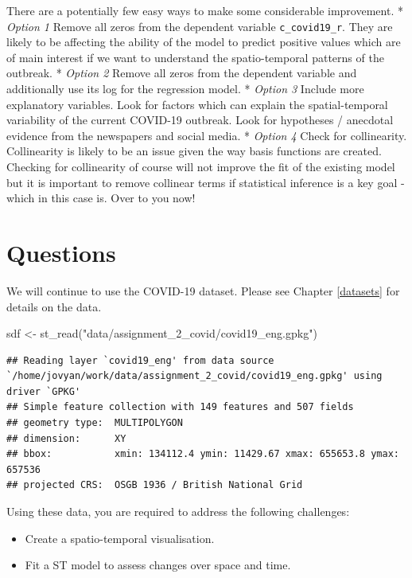 \documentclass[
]{book}
\newenvironment{Shaded}{\begin{snugshade}}{\end{snugshade}}
\newcommand{\FunctionTok}[1]{\textcolor[rgb]{0.00,0.00,0.00}{#1}}
\newcommand{\NormalTok}[1]{#1}
\newcommand{\OtherTok}[1]{\textcolor[rgb]{0.56,0.35,0.01}{#1}}
\newcommand{\StringTok}[1]{\textcolor[rgb]{0.31,0.60,0.02}{#1}}
\begin{document}
There are a potentially few easy ways to make some considerable improvement.
* \emph{Option 1} Remove all zeros from the dependent variable \texttt{c\_covid19\_r}. They are likely to be affecting the ability of the model to predict positive values which are of main interest if we want to understand the spatio-temporal patterns of the outbreak.
* \emph{Option 2} Remove all zeros from the dependent variable and additionally use its log for the regression model.
* \emph{Option 3} Include more explanatory variables. Look for factors which can explain the spatial-temporal variability of the current COVID-19 outbreak. Look for hypotheses / anecdotal evidence from the newspapers and social media.
* \emph{Option 4} Check for collinearity. Collinearity is likely to be an issue given the way basis functions are created. Checking for collinearity of course will not improve the fit of the existing model but it is important to remove collinear terms if statistical inference is a key goal - which in this case is. Over to you now!

\hypertarget{questions-6}{%
\section{Questions}\label{questions-6}}

We will continue to use the COVID-19 dataset. Please see Chapter \ref{datasets} for details on the data.

\begin{Shaded}
\begin{Highlighting}[]
\NormalTok{sdf }\OtherTok{\textless{}{-}} \FunctionTok{st\_read}\NormalTok{(}\StringTok{"data/assignment\_2\_covid/covid19\_eng.gpkg"}\NormalTok{)}
\end{Highlighting}
\end{Shaded}

\begin{verbatim}
## Reading layer `covid19_eng' from data source `/home/jovyan/work/data/assignment_2_covid/covid19_eng.gpkg' using driver `GPKG'
## Simple feature collection with 149 features and 507 fields
## geometry type:  MULTIPOLYGON
## dimension:      XY
## bbox:           xmin: 134112.4 ymin: 11429.67 xmax: 655653.8 ymax: 657536
## projected CRS:  OSGB 1936 / British National Grid
\end{verbatim}

Using these data, you are required to address the following challenges:

\begin{itemize}
\item
  Create a spatio-temporal visualisation.
\item
  Fit a ST model to assess changes over space and time.
\end{itemize}
\end{document}
